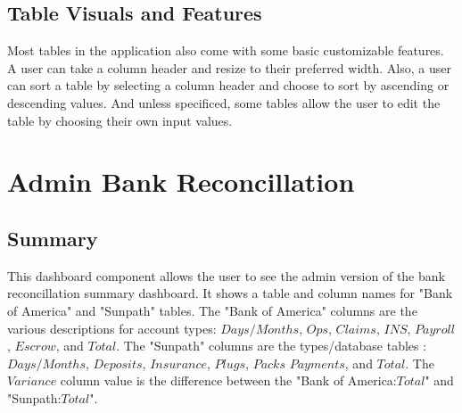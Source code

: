 \documentclass[titlepage]{article}
\begin{document}
\subsection{Table Visuals and Features}
Most tables in the application also come with some basic customizable features. A user can take a column header and resize to their preferred width. Also, a user can sort a table by selecting a column header and choose to sort by ascending or descending values. And unless specificed, some tables allow the user to edit the table by choosing their own input values. 
\newpage
\section{Admin Bank Reconcillation}
\subsection{Summary}
This dashboard component allows the user to see the admin version of the bank reconcillation summary dashboard. It shows a table and column names for "Bank of America" and "Sunpath" tables. The "Bank of America" columns are the various descriptions for account types: $Days/Months$, $Ops$, $Claims$, $INS$, $Payroll$, $Escrow$, and $Total$. The "Sunpath" columns are the types/database tables : $Days/Months$, $Deposits$, $Insurance$, $Plugs$, $Packs$ $Payments$, and $Total$. The $Variance$ column value is the difference between the "Bank of America:$Total$" and "Sunpath:$Total$".
\end{document}
